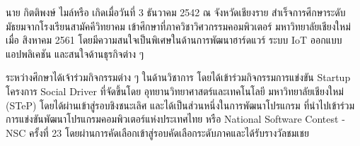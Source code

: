 \documentclass[semifinal]{cpecmu}
\begin{document}
\begin{biosketch}
\begin{center}
\end{center}
นาย กิตติพงษ์ ไมล์หรือ เกิดเมื่อวันที่ 3 ธันวาคม 2542 ณ จังหวัดเชียงราย สำเร็จการศึกษาระดับมัธยมจากโรงเรียนสามัคคีวิทยาคม เข้าศึกษาที่ภาควิชาวิศวกรรมคอมพิวเตอร์ มหาวิทยาลัยเชียงใหม่ เมื่อ สิงหาคม 2561 โดยมีความสนใจเป็นพิเศษในด้านการพัฒนาฮาร์ดแวร์ ระบบ IoT ออกแบบแอปพลิเคชัน และสนใจด้านธุรกิจต่าง ๆ

ระหว่างศึกษาได้เจ้าร่วมกิจกรรมต่าง ๆ ในด้านวิชาการ  โดยได้เข้าร่วมกิจกรรมการแข่งขัน Startup โครงการ Social Driver ที่จัดขึ้นโดย อุทยานวิทยาศาสตร์และเทคโนโลยี มหาวิทยาลัยเชียงใหม่ (STeP) โดยได้ผ่านเข้าสู่รอบชิงชนะเลิศ และได้เป็นส่วนหนึ่งในการพัฒนาโปรแกรม ที่นำไปเข้าร่วมการแข่งขันพัฒนาโปรแกรมคอมพิวเตอร์แห่งประเทศไทย 
หรือ National Software Contest - NSC ครั้งที่ 23 โดยผ่านการคัดเลือกเข้าสู่รอบคัดเลือกระดับภาคและได้รับรางวัลชมเชย
\end{biosketch}
\fi %
\end{document}
